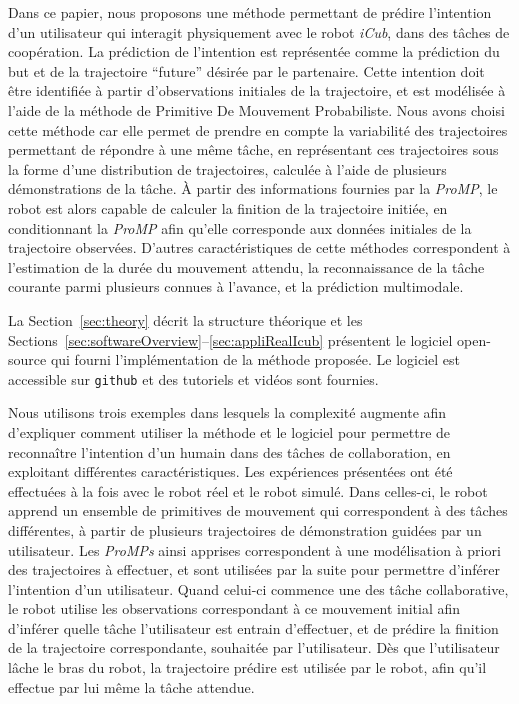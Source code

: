 \documentclass[utf8]{frontiersSCNS} %
\begin{document}
Dans ce papier, nous proposons une méthode permettant de prédire l'intention d'un utilisateur qui interagit physiquement avec le robot \textit{iCub}, dans des tâches de coopération. La prédiction de l'intention est représentée comme la prédiction du but et de la trajectoire ``future'' désirée par le partenaire. Cette intention doit être identifiée à partir d'observations initiales de la trajectoire, et est modélisée à l'aide de la méthode de Primitive De Mouvement Probabiliste. Nous avons choisi cette méthode car elle permet de prendre en compte la variabilité des trajectoires permettant de répondre à une même tâche, en représentant ces trajectoires sous la forme d'une distribution de trajectoires, calculée à l'aide de plusieurs démonstrations de la tâche.
À partir des informations fournies par la \textit{ProMP}, le robot est alors capable de calculer la finition de la trajectoire initiée, en conditionnant la \textit{ProMP} afin qu'elle corresponde aux données initiales de la trajectoire observées.
D'autres caractéristiques de cette méthodes correspondent à l'estimation de la durée du mouvement attendu, la reconnaissance de la tâche courante parmi plusieurs connues à l'avance, et la prédiction multimodale.

La Section~\ref{sec:theory} décrit la structure théorique et les Sections~\ref{sec:softwareOverview}--\ref{sec:appliRealIcub} présentent le logiciel open-source qui fourni l'implémentation de la méthode proposée. 
Le logiciel est accessible sur \texttt{github} et des tutoriels et vidéos sont fournies.

Nous utilisons trois exemples dans lesquels la complexité augmente afin d'expliquer comment utiliser la méthode et le logiciel pour permettre de reconnaître l'intention d'un humain dans des tâches de collaboration, en exploitant différentes caractéristiques.
Les expériences présentées ont été effectuées à la fois avec le robot réel et le robot simulé. Dans celles-ci, le robot apprend un ensemble de primitives de mouvement qui correspondent à des tâches différentes, à partir de plusieurs trajectoires de démonstration guidées par un utilisateur. Les \textit{ProMPs} ainsi apprises correspondent à une modélisation à priori des trajectoires à effectuer, et sont utilisées par la suite pour permettre d'inférer l'intention d'un utilisateur.
Quand celui-ci commence une des tâche collaborative, le robot utilise les observations correspondant à ce mouvement initial afin d'inférer quelle tâche l'utilisateur est entrain d'effectuer, et de prédire la finition de la trajectoire correspondante, souhaitée par l'utilisateur. Dès que l'utilisateur lâche le bras du robot, la trajectoire prédire est utilisée par le robot, afin qu'il effectue par lui même la tâche attendue.
\end{document}
